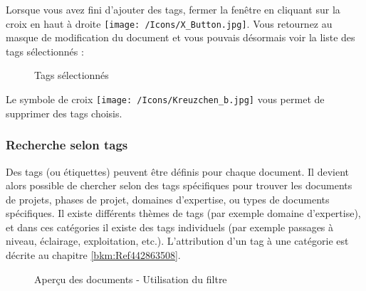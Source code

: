 Lorsque vous avez fini d'ajouter des tags, fermer la fenêtre en cliquant sur la croix en haut à droite \texttt{[image: /Icons/X\_Button.jpg]}. Vous retournez au masque de modification du document et vous pouvais désormais voir la liste des tags sélectionnés :

\begin{figure}[H]
\caption{Tags sélectionnés}
\end{figure}

Le symbole de croix \texttt{[image: /Icons/Kreuzchen\_b.jpg]}  vous permet de supprimer des tags choisis.




\subsubsection{Recherche selon tags}
\label{bkm:Ref442275849}

Des tags (ou étiquettes) peuvent être définis pour chaque document. Il devient alors possible de chercher selon des tags spécifiques pour trouver les documents de projets, phases de projet, domaines d'expertise, ou types de documents spécifiques. Il existe différents thèmes de tags (par exemple domaine d'expertise), et dans ces catégories il existe des tags individuels (par exemple passages à niveau, éclairage, exploitation, etc.). L'attribution d'un tag à une catégorie est décrite au chapitre \ref{bkm:Ref442863508}.

\begin{figure}[H]
\caption{Aperçu des documents - Utilisation du filtre}
\end{figure}

